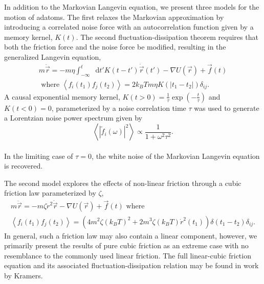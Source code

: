 \documentclass[7pt]{article}
\newcommand*{\diff}{\mathop{}\!\mathrm{d}}
\begin{document}
In addition to the Markovian Langevin equation, we present three models for the motion of adatoms. The first relaxes the Markovian approximation by introducing a correlated noise force with an autocorrelation function given by a memory kernel, $K(t)$. The second fluctuation-dissipation theorem requires that both the friction force and the noise force be modified, resulting in the generalized Langevin equation\cite{Kubo},
\begin{equation}
\begin{gathered}
	m\ddot{\vec{r}}=-m\eta\int_{-\infty}^t\diff{t'}K(t-t')\dot{\vec{r}}(t') - \nabla U(\vec{r}) + \vec{f}(t) \\
	\text{ where } \left<f_i(t_1)f_j(t_2)\right>=2k_BTm\eta K(\left|t_1-t_2\right|)\delta_{ij}.
\end{gathered}
	\label{eq:gle}
\end{equation}
A causal exponential memory kernel, $K(t>0)=\frac{1}{\tau}\exp\left(-\frac{t}{\tau}\right)$ and $K(t<0)=0$, parameterized by a noise correlation time $\tau$ was used to generate a Lorentzian noise power spectrum given by
\\
\begin{equation}
	\left<|\tilde{f}_i(\omega)|^2\right> \propto \frac{1}{1 + \omega^2\tau^2}.
\end{equation}
\\
In the limiting case of $\tau=0$, the white noise of the Markovian Langevin equation is recovered. 

The second model explores the effects of non-linear friction through a cubic friction law parameterized by $\zeta$\cite{Kramers},
\begin{equation}
\begin{gathered}
	m\ddot{\vec{r}} = - m\zeta\dot{r}^2\dot{\vec{r}} - \nabla U(\vec{r}) + \vec{f}(t) \text{ where } \\
	\left<f_i(t_1)f_j(t_2)\right>=\left(4m^2\zeta\left(k_BT\right)^2 + 2 m^3 \zeta \left(k_BT\right)\dot{r}^2(t_1)\right)\delta\left(t_1-t_2\right)\delta_{ij}. 
\end{gathered}
\end{equation}
In general, such a friction law may also contain a linear component, however, we primarily present the results of pure cubic friction as an extreme case with no resemblance to the commonly used linear friction. The full linear-cubic friction equation and its associated fluctuation-dissipation relation may be found in work by Kramers\cite{Kramers}. 
\end{document}
